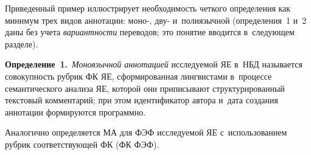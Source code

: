 \begin{multicols}{2}
   Приведенный пример иллюстрирует необходимость четкого определения 
как минимум трех видов аннотации: моно-, дву- и~полиязычной (определения~1 
и~2 даны без учета \textit{вариантности} переводов; это понятие вводится 
в~следующем разделе).
   
   \vspace*{3pt}
   
   \noindent
   \textbf{Определение~1.}\ \textit{Моноязычной аннотацией}  
исследуемой ЯЕ в~НБД называется совокупность рубрик 
ФК ЯЕ, сформированная 
лингвистами в~процессе семантического анализа ЯЕ, которой 
они приписывают структурированный текстовый комментарий; при этом 
идентификатор автора и~дата создания аннотации формируются программно.
   
   \smallskip
   
   Аналогично определяется МА для ФЭФ исследуемой 
ЯЕ с~использованием рубрик соответству\-ющей ФК
(ФК ФЭФ).

\begin{table*}\small %
\begin{center}
\vspace*{2ex}


\end{center}
\end{table*}
\end{multicols}
